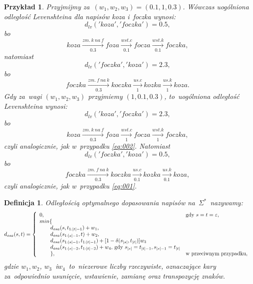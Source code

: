 \documentclass[12pt, twoside, openany]{report}
\theoremstyle{plain}
\newtheorem{defi}{Definicja}[section]
\newtheorem{prz}{Przykład}[section]
\begin{document}
\begin{prz}
Przyjmijmy za~$(w_1, w_2, w_3) = (0.1, 1, 0.3)$. Wówczas uogólniona odległość Levenshteina dla napisów \emph{koza} i~\emph{foczka} wynosi:
\begin{equation}
\label{eq:001}
d_{lv}('koza', 'foczka') = 0.5,
\end{equation}
bo
$$
koza  \xrightarrow[0.3]{zm.\ k\ na\ f} foza  \xrightarrow[0.1]{wst. c} focza \xrightarrow[0.1]{wst. k} foczka,
$$
natomiast
\begin{equation}\label{eq:002}
d_{lv}('foczka', 'koza') = 2.3,
\end{equation}
bo
$$
foczka  \xrightarrow[0.3]{zm.\ f\ na\ k} koczka  \xrightarrow[1]{us. c} kozka \xrightarrow[1]{us. k} koza.
$$
Gdy za~wagi $(w_1, w_2, w_3)$ przyjmiemy $(1, 0.1, 0.3)$, to~uogólniona odległość Levenshteina wynosi:
$$
d_{lv}('koza', 'foczka') = 2.3,
$$
bo
$$
koza  \xrightarrow[0.3]{zm.\ k\ na\ f} foza  \xrightarrow[1]{wst. c} focza \xrightarrow[1]{wst. k} foczka,
$$
czyli analogicznie, jak w~przypadku \ref{eq:002}. Natomiast
$$
d_{lv}('foczka', 'koza') = 0.5,
$$
bo
$$
foczka  \xrightarrow[0.3]{zm.\ f\ na\ k} koczka  \xrightarrow[0.1]{us. c} kozka \xrightarrow[0.1]{us. k} koza,
$$
czyli analogicznie, jak w~przypadku \ref{eq:001}.
\end{prz}


\begin{defi}
\emph{Odległością optymalnego dopasowania napisów} na~$\Sigma^*$~nazywamy:
$$
d_{osa}(s, t) = \left\{
\begin{array}{l l}     
    0, & \text{gdy } s = t = \varepsilon,\\
    min\{ & \\
\qquad    d_{osa}(s, t_{1:|t|-1}) + w_1, & \\
\qquad    d_{osa}(s_{1:|s|-1}, t) + w_2, & \\
\qquad    d_{osa}(s_{1:|s|-1}, t_{1:|t|-1}) + [1-\delta(s_{|s|}, t_{|t|})]w_3 & \\
\qquad    d_{osa}(s_{1:|s|-2}, t_{1:|t|-2}) + w_4\text{, gdy } s_{|s|} = t_{|t|-1}, s_{|s|-1} = t_{|t|} & \\
\qquad    \}, & \text{w przeciwnym przypadku},
\end{array}\right.
$$
gdzie $w_1, w_2$, $w_3$~i$w_4$~to~niezerowe liczby rzeczywiste, oznaczające kary za~odpowiednio usunięcie, wstawienie, zamianę oraz transpozycję znaków.
\end{defi}
\end{document}
